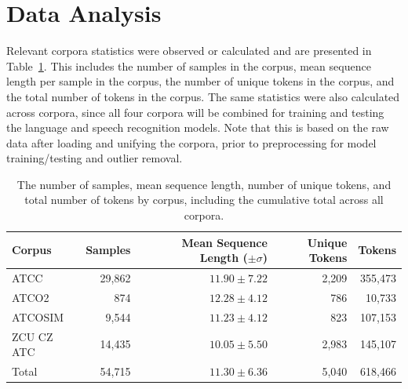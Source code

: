 \documentclass[12pt]{article}
\begin{document}
\section{Data Analysis}\label{sec:data_analysis}
Relevant corpora statistics were observed or calculated and are presented in Table~\ref{tab:corpora_stats}. This includes the number of samples in
the corpus, mean sequence length per sample in the corpus, the number of unique tokens in the corpus, and the total number of tokens in the corpus.
The same statistics were also calculated across corpora, since all four corpora will be combined for training and testing the language and speech
recognition models. Note that this is based on the raw data after loading and unifying the corpora, prior to preprocessing for model training/testing
and outlier removal.


\begin{table}[h!]
    \centering
    \begin{tabular}{l r r r r}
        \toprule
        \textbf{Corpus} & \textbf{Samples} & \textbf{Mean Sequence Length (\(\pm \sigma\))} & \textbf{Unique Tokens} & \textbf{Tokens} \\
        \midrule
        ATCC            & 29,862           & \(11.90 \pm 7.22\)                             & 2,209                  & 355,473         \\
        ATCO2           & 874              & \(12.28 \pm 4.12\)                             & 786                    & 10,733          \\
        ATCOSIM         & 9,544            & \(11.23 \pm 4.12\)                             & 823                    & 107,153         \\
        ZCU CZ ATC      & 14,435           & \(10.05 \pm 5.50\)                             & 2,983                  & 145,107         \\
        \midrule
        Total           & 54,715           & \(11.30 \pm 6.36\)                             & 5,040                  & 618,466         \\
        \bottomrule
    \end{tabular}
    \caption{The number of samples, mean sequence length, number of unique tokens, and total number of tokens by corpus, including the cumulative
        total across all corpora.}
    \label{tab:corpora_stats}
\end{table}
\end{document}
